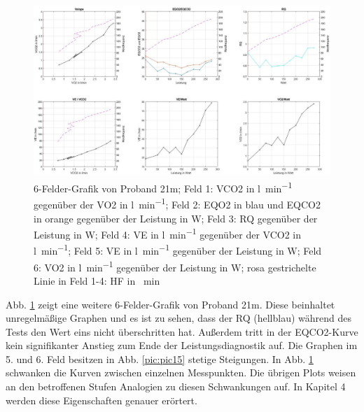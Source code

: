 %
\begin{figure}[H]
	\centering
	\includegraphics[width=\textwidth]{Bilder/plot_21m.jpg}
	\caption[6-Felder-Grafik von Proband 21m]{6-Felder-Grafik von Proband 21m; Feld 1: \gls{VCO2} in \si{\litre\per\minute} gegenüber der \gls{VO2} in \si{\litre\per\minute}; Feld 2: \gls{EQO2} in blau und \gls{EQCO2} in orange gegenüber der Leistung in \si{\watt}; Feld 3: \gls{RQ} gegenüber der Leistung in \si{\watt}; Feld 4: \gls{VE} in \si{\litre\per\minute} gegenüber der \gls{VCO2} in \si{\litre\per\minute}; Feld 5: \gls{VE} in \si{\litre\per\minute} gegenüber der Leistung in \si{\watt}; Feld 6: \gls{VO2} in \si{\litre\per\minute} gegenüber der Leistung in \si{\watt}; rosa gestrichelte Linie in Feld 1-4: \gls{HF} in \si{\per\minute}}
	\label{pic:pic16}
\end{figure}
%
Abb. \ref{pic:pic16} zeigt eine weitere 6-Felder-Grafik von Proband 21m. Diese beinhaltet unregelmäßige Graphen und es ist zu sehen, dass der RQ (hellblau) während des Tests den Wert eins nicht überschritten hat. Außerdem tritt in der \gls{EQCO2}-Kurve kein signifikanter Anstieg zum Ende der Leistungsdiagnostik auf. Die Graphen im 5. und 6. Feld besitzen in Abb. \ref{pic:pic15} stetige Steigungen. In Abb. \ref{pic:pic16} schwanken die Kurven zwischen einzelnen Messpunkten. Die übrigen Plots weisen an den betroffenen Stufen Analogien zu diesen Schwankungen auf. In Kapitel 4 werden diese Eigenschaften genauer erörtert.
%
